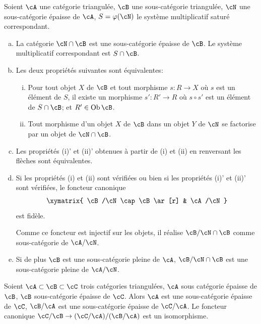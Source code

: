 \begin{theorem}\label{VIII:2-4-2}
Soient $\cA$ une catégorie triangulée, $\cB$ une sous-catégorie 
triangulée, $\cN$ une sous-catégorie épaisse de $\cA$, $S=\varphi(\cN)$ 
le système multiplicatif saturé correspondant. 
\begin{enumerate}[(a)]
  \item La catégorie $\cN\cap\cB$ est une sous-catégorie épaisse de 
    $\cB$. Le système multiplicatif correspondant est $S\cap \cB$. 
  \item Les deux propriétés suivantes sont équivalentes: 
    \begin{enumerate}[(i)]
      \item Pour tout objet $X$ de $\cB$ et tout morphisme $s:R\to X$ où $s$ 
        est un élément de $S$, il existe un morphisme $s':R'\to R$ où 
        $s\circ s'$ est un élément de $S\cap \cB$; et 
        $R'\in\operatorname{Ob}\cB$. 
      \item Tout morphisme d'un objet $X$ de $\cB$ dans un objet $Y$ de $\cN$ 
        se factorise par un objet de $\cN\cap \cB$. 
    \end{enumerate}
  \item Les propriétés (i)' et (ii)' obtenues à partir de (i) et (ii) en 
    renversant les flèches sont équivalentes. 
  \item Si les propriétés (i) et (ii) sont vérifiées ou bien si les 
    propriétés (i)' et (ii)' sont vérifiées, le foncteur canonique 
    \[\xymatrix{
      \cB/\cN\cap \cB \ar[r] & \cA/\cN
    }\]
    est fidèle. 
    
    Comme ce foncteur est injectif sur les objets, il réalise 
    $\cB/\cN\cap\cB$ comme sous-catégorie de $\cA/\cN$. 
  \item Si de plus $\cB$ est une sous-catégorie pleine de $\cA$, 
    $\cB/\cN\cap \cB$ est une sous-catégorie pleine de $\cA/\cN$. 
\end{enumerate}
\end{theorem}





\begin{corollary}\label{VIII:2-4-3}
Soient $\cA\subset \cB\subset \cC$ trois catégories triangulées, $\cA$ sous 
catégorie épaisse de $\cB$, $\cB$ sous-catégorie épaisse de $\cC$. 
Alors $\cA$ est une sous-catégorie épaisse de $\cC$, $\cB/\cA$ est une 
sous-catégorie épaisse de $\cC/\cA$. Le foncteur canonique 
$\cC/\cB \to (\cC/\cA)/(\cB/\cA)$ est un isomorphisme. 
\end{corollary}










